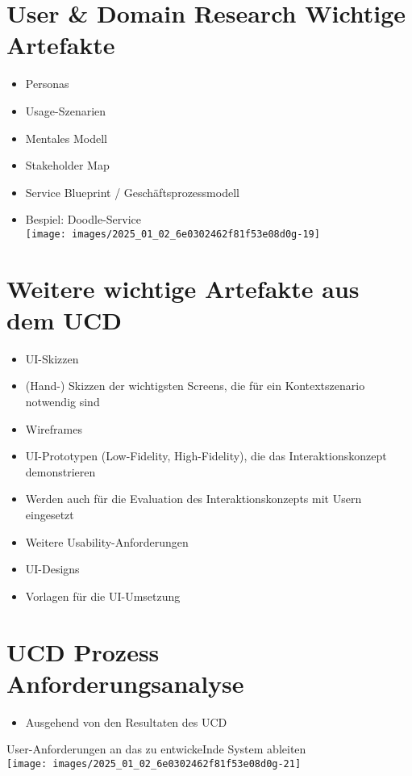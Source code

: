 \documentclass[10pt]{article}
\begin{document}
\section*{User \& Domain Research Wichtige Artefakte}
\begin{itemize}
  \item Personas
  \item Usage-Szenarien
  \item Mentales Modell
  \item Stakeholder Map
  \item Service Blueprint / Geschäftsprozessmodell
  \item Bespiel: Doodle-Service\\
\texttt{[image: images/2025\_01\_02\_6e0302462f81f53e08d0g-19]}
\end{itemize}

\section*{Weitere wichtige Artefakte aus dem UCD}
\begin{itemize}
  \item UI-Skizzen
  \item (Hand-) Skizzen der wichtigsten Screens, die für ein Kontextszenario notwendig sind
  \item Wireframes
  \item UI-Prototypen (Low-Fidelity, High-Fidelity), die das Interaktionskonzept demonstrieren
  \item Werden auch für die Evaluation des Interaktionskonzepts mit Usern eingesetzt
  \item Weitere Usability-Anforderungen
  \item UI-Designs
  \item Vorlagen für die UI-Umsetzung
\end{itemize}

\section*{UCD Prozess \\
 Anforderungsanalyse}
\begin{itemize}
  \item Ausgehend von den Resultaten des UCD
\end{itemize}

User-Anforderungen an das zu entwickeInde System ableiten\\
\texttt{[image: images/2025\_01\_02\_6e0302462f81f53e08d0g-21]}
\end{document}
